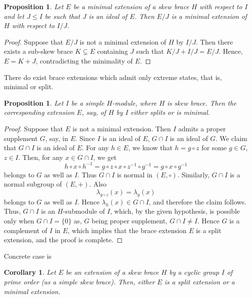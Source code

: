 \documentclass[11pt]{amsart}
\theoremstyle{thrm}
\theoremstyle{plain}
\newtheorem{prop}[thm]{Proposition}
\newtheorem{cor}[thm]{Corollary}
\theoremstyle{definition}
\numberwithin{equation}{section}
\begin{document}
\begin{prop}
	Let $E$ be a minimal extension of a skew brace $H$ with respect to  $I$ and let $J \leq I$ be such that  $J$ is an ideal of $E$. Then $E/J$ is a minimal extension of $H$ with respect to $I/J$. 
\end{prop}

\begin{proof}
Suppose that \( E/J \) is not a minimal extension of \( H \) by \( I/J \). Then there exists a sub-skew brace \( K \subsetneq E \) containing \( J \) such that \( K/J + I/J = E/J \). Hence, \( E = K + J \), contradicting the minimality of \( E \).
\end{proof}

There do exist brace extensions which admit only extreme states, that is, minimal or split. 
\begin{prop}
Let $I$ be a simple $H$-module, where $H$ is skew brace. Then the corresponding extension $E$, say,  of $H$ by $I$  either splits  or is minimal. 
\end{prop}
\begin{proof}
Suppose that \( E \) is not a minimal extension. Then $I$ admits a proper supplement $G$, say, in $E$.  Since $I$ is an ideal of $E$, $G \cap I$ is an ideal of $G$.  We claim that \( G \cap I \) is an ideal of \( E \).  For any  \( h \in E \),  we know that \( h = g \circ z \) for some \( g \in G \), \( z \in I \). Then, for any \( x \in G \cap I \), we get
	\[
	h \circ x \circ h^{-1} = g \circ z \circ x \circ z^{-1} \circ g^{-1} = g \circ x \circ g^{-1}
	\]
belongs to $G$ as well as $I$. Thus \( G \cap I \) is normal in \( (E, \circ) \). Similarly,  \( G \cap I \) is a normal subgroup of \( (E, +) \). Also
	\[
	\lambda_{g \circ z}(x) = \lambda_g(x)
	\]
belongs to $G$ as well as $I$. Hence \( \lambda_h(x) \in G \cap I \), and therefore the claim follows.   Thus, \( G \cap I \) is an \( H \)-submodule of \( I \), which, by the given hypothesis,  is possible only when $G \cap I = \{0\}$ as, $G$ being proper supplement, $G \cap I \ne I$. Hence $G$ is a complement of $I$ in $E$, which  implies that the brace extension \( E \) is a split extension, and the proof is complete.
	\end{proof}

 Concrete case is
\begin{cor}
Let $E$ be an extension of a skew brace $H$ by a cyclic group $I$ of prime order (as a simple skew brace). Then, either $E$ is a split extension or a minimal extension.
\end{cor}
\end{document}
